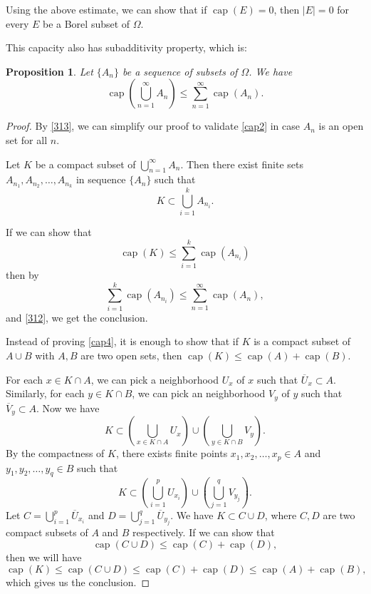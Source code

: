 \documentclass[a4paper, 11pt]{report}
\newtheorem{prn}{Proposition}[chapter]
\theoremstyle{definition}\newtheorem*{rmk}{Remark}
\DeclareMathOperator{\capa}{cap}
\begin{document}
Using the above estimate, we can show that if $\capa(E) = 0$, then $|E| = 0$ for every $E$ be a Borel subset of $\Omega$.

This capacity also has subadditivity property, which is:

\begin{prn}\label{cap2thm}
Let $\{A_n\}$ be a sequence of subsets of $\Omega$. We have
\begin{equation}\label{cap2}
\capa\left(\bigcup\limits_{n=1}^{\infty}A_n\right) \le \sum\limits_{n=1}^{\infty}\capa(A_n).
\end{equation}
\end{prn}\label{311prn}

\begin{proof}
By \eqref{313}, we can simplify our proof to validate \eqref{cap2} in case $A_n$ is an open set for all $n$.

Let $K$ be a compact subset of $\bigcup\limits_{n=1}^{\infty} A_n$. Then there exist finite sets $A_{n_1},A_{n_2},\ldots ,A_{n_k}$ in sequence $\{A_n\}$ such that
\[
K\subset \bigcup\limits_{i=1}^{k} A_{n_i}.
\]

If we can show that
\begin{equation}\label{cap4}
\capa(K) \le \sum\limits_{i=1}^{k}\capa(A_{n_i})
\end{equation}
then by
\[
\sum\limits_{i=1}^{k}\capa(A_{n_i}) \le \sum\limits_{n=1}^{\infty}\capa(A_n),
\]
and \eqref{312}, we get the conclusion.

Instead of proving \eqref{cap4}, it is enough to show that if $K$ is a compact subset of $A \cup B$ with $A, B$ are two open sets, then $\capa(K) \le \capa(A) + \capa(B)$.

For each $x \in K \cap A$, we can pick a neighborhood $U_x$ of $x$ such that $\overline{U}_x \subset A$. Similarly, for each $y \in K \cap B$, we can pick an neighborhood $V_y$ of $y$ such that $\overline{V}_y \subset A$. Now we have
\[
K \subset \left(\bigcup\limits_{x\in K\cap A}U_x \right)\cup \left(\bigcup\limits_{y\in K\cap B}V_y\right).
\]
By the compactness of $K$, there exists finite points $x_1, x_2,\ldots, x_p\in A$ and $y_1,y_2,\ldots,y_q\in B$ such that
\[
K \subset  \left(\bigcup\limits_{i=1}^{p} U_{x_i} \right)\cup  \left( \bigcup\limits_{j=1}^{q} V_{y_j}\right) .
\]
Let $C = \bigcup\limits_{i=1}^{p} \overline{U}_{x_i}$ and $D = \bigcup\limits_{j=1}^{q} \overline{U}_{y_j}$. We have $K \subset C \cup D$, where $C,D$ are two compact subsets of $A$ and $B$ respectively. If we can show that
\begin{equation}\label{cap5}
\capa (C \cup D) \le \capa(C) + \capa(D),
\end{equation}
then we will have
\[
\capa(K) \le \capa(C\cup D) \le \capa(C) + \capa(D) \le \capa(A) + \capa(B),
\]
which gives us the conclusion.


\end{proof}
\end{document}
